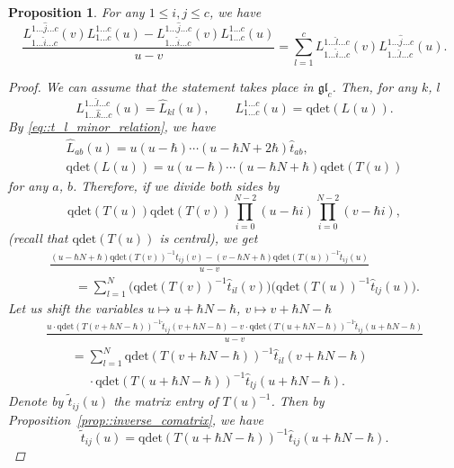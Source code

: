 \documentclass[10pt,a4paper]{article}
\numberwithin{equation}{section}
\newtheorem{Proposition}[Theorem]{Proposition}
{ \theoremstyle{definition}
	\newtheorem{Definition}[Theorem]{Definition}
	\newtheorem{Note}[Theorem]{Note}
	\newtheorem{Example}[Theorem]{Example}
	\newtheorem{Remark}[Theorem]{Remark} }
\newcommand{\qdet}{\mathrm{qdet}}
\newcommand{\gl}{\mathfrak{gl}}
\begin{document}
	\begin{Proposition}
		\label{prop::inv_qdet_sum}
		For any $1\leq i,j \leq c$, we have
		\[
		\frac{L_{1\dots \hat{i} \dots c}^{1\dots \hat{j} \dots c}(v) L_{1\dots c}^{1\dots c}(u) - L_{1\dots \hat{i} \dots c}^{1\dots \hat{j} \dots c}(v) L_{1\dots c}^{1\dots c}(u)}{u-v} = \sum\limits_{l=1}^c L_{1\dots \hat {i} \dots c}^{1\dots \hat{l} \dots c}(v) L_{1\dots \hat{l} \dots c}^{1\dots \hat{j} \dots c}(u).
		\]
		
		\begin{proof}
			We can assume that the statement takes place in $\gl_c$. Then, for any $k$, $l$
			\[
				L_{1\dots \hat{k} \dots c}^{1\dots \hat{l} \dots c}(u) = \hat{L}_{kl}(u), \qquad
				L_{1\dots c}^{1\dots c}(u) = \qdet(L(u)).
			\]
			By \eqref{eq::t_l_minor_relation}, we have
			\begin{gather*}
				\hat{L}_{ab}(u) = u(u-\hbar)\cdots (u-\hbar N + 2\hbar) \hat{t}_{ab}, \\
				\qdet(L(u)) = u(u-\hbar) \cdots (u-\hbar N+\hbar) \qdet(T(u))
			\end{gather*}
			for any $a$, $b$. Therefore, if we divide both sides by
			\[
			\qdet(T(u)) \qdet(T(v)) \prod\limits_{i=0}^{N-2} (u - \hbar i) \prod\limits_{i=0}^{N-2} (v - \hbar i),
			\]
			(recall that $\qdet(T(u))$ is central), we get
			\begin{gather*}
				\frac{(u-\hbar N+\hbar) \qdet(T(v))^{-1} \hat{t}_{ij}(v) - (v-\hbar N+ \hbar) \qdet(T(u))^{-1}\hat{t}_{ij}(u)}{u-v} \\
				\qquad= \sum\limits_{l=1}^N \bigl(\qdet(T(v))^{-1} \hat{t}_{il}(v)\bigr) \bigl(\qdet(T(u))^{-1} \hat{t}_{lj}(u)\bigr).
			\end{gather*}
			Let us shift the variables $u \mapsto u + \hbar N-\hbar$, $v \mapsto v + \hbar N-\hbar$
			\begin{gather*}
				\frac{u\cdot \qdet(T(v + \hbar N - \hbar))^{-1} \hat{t}_{ij}(v + \hbar N-\hbar) - v \cdot \qdet(T(u + \hbar N-\hbar))^{-1}\hat{t}_{ij}(u + \hbar N-\hbar)}{u-v} \\
				\qquad= \sum\limits_{l=1}^N \qdet(T(v + \hbar N-\hbar))^{-1} \hat{t}_{il}(v + \hbar N-\hbar)\\
\phantom{\qquad=}{}\cdot \qdet(T(u + \hbar N-\hbar))^{-1} \hat{t}_{lj}(u + \hbar N-\hbar).
			\end{gather*}
			Denote by $\tilde{t}_{ij}(u)$ the matrix entry of $T(u)^{-1}$. Then by Proposition~\ref{prop::inverse_comatrix}, we have
			\[
			\tilde{t}_{ij}(u) = \qdet(T(u + \hbar N-\hbar))^{-1} \hat{t}_{ij} (u + \hbar N-\hbar ).
\]
\end{proof}
\end{Proposition}
\end{document}
